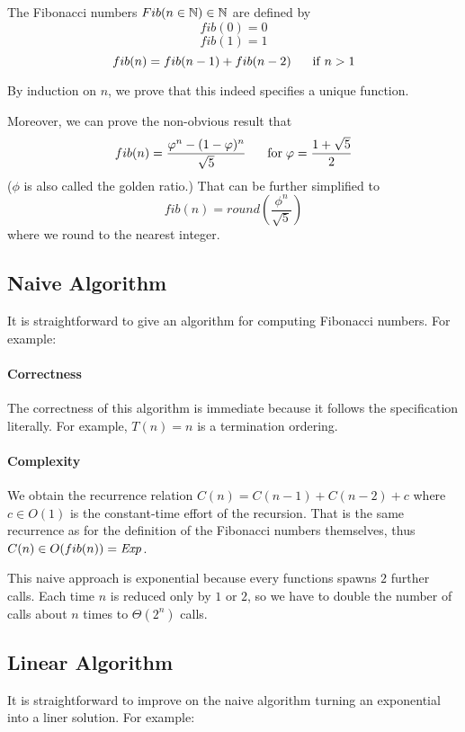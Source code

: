 The Fibonacci numbers $Fib(n\in\mathbb{N})\in\mathbb{N}$ are defined by
\[fib(0)=0\]
\[fib(1)=1\]
\[fib(n)=fib(n-1)+fib(n-2) \hspace*{.5cm}\;\mathrm{if}\; n>1\]

By induction on $n$, we prove that this indeed specifies a unique function.

Moreover, we can prove the non-obvious result that
 \[fib(n)=\frac{\varphi^n-(1-\varphi)^n}{\sqrt{5}} \hspace*{.5cm}\;\mathrm{for}\; \varphi=\frac{1+\sqrt{5}}{2}\]
($\phi$ is also called the golden ratio.)
That can be further simplified to
 \[fib(n)=round\left(\frac{\phi^n}{\sqrt{5}}\right)\]
where we round to the nearest integer.

\subsection{Naive Algorithm}\label{sec:ad:fib:naive}

It is straightforward to give an algorithm for computing Fibonacci numbers.
For example:
\begin{acode}
\end{acode}

\paragraph{Correctness}
The correctness of this algorithm is immediate because it follows the specification literally.
For example, $T(n)=n$ is a termination ordering.

\paragraph{Complexity}
We obtain the recurrence relation $C(n)=C(n-1)+C(n-2)+c$ where $c\in O(1)$ is the constant-time effort of the recursion.
That is the same recurrence as for the definition of the Fibonacci numbers themselves, thus $C(n)\in O(fib(n))=\mathit{Exp}$.

This naive approach is exponential because every functions spawns $2$ further calls.
Each time $n$ is reduced only by $1$ or $2$, so we have to double the number of calls about $n$ times to $\Theta(2^n)$ calls.

\subsection{Linear Algorithm}\label{sec:ad:fib:linear}

It is straightforward to improve on the naive algorithm turning an exponential into a liner solution.
For example:
\begin{acode}
\end{acode}


